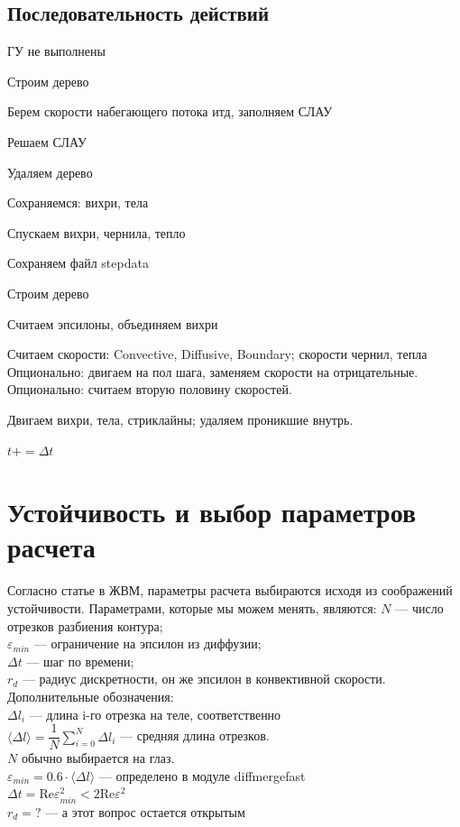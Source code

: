 \documentclass[14pt]{extreport}
\newcommand{\Reyn}{\text{Re}}
\newenvironment{packed_enum}{
\begin{enumerate}
  \setlength{\itemsep}{1pt}
  \setlength{\parskip}{0pt}
  \setlength{\parsep}{0pt}
}{\end{enumerate}}
\begin{document}
\subsection{Последовательность действий}
\begin{packed_enum}
\item ГУ не выполнены\\
\item Строим дерево
\item Берем скорости набегающего потока итд, заполняем СЛАУ
\item Решаем СЛАУ
\item Удаляем дерево\\
\item Сохраняемся: вихри, тела
\item Спускаем вихри, чернила, тепло
\item Сохраняем файл stepdata\\
\item Строим дерево
\item Считаем эпсилоны, объединяем вихри
\item Считаем скорости: Convective, Diffusive, Boundary; скорости чернил, тепла
\subitem Опционально: двигаем на пол шага, заменяем скорости на отрицательные.
\subitem Опционально: считаем вторую половину скоростей.
\item Двигаем вихри, тела, стриклайны; удаляем проникшие внутрь.
\item $t += \Delta t$
\end{packed_enum}

\newpage
\section{Устойчивость и выбор параметров расчета}
Согласно статье в ЖВМ, параметры расчета выбираются исходя из
соображений устойчивости. Параметрами, которые мы можем менять, являются:
$N$ --- число отрезков разбиения контура;\\
$\varepsilon_{min}$ --- ограничение на эпсилон из диффузии;\\
$\Delta t$ --- шаг по времени;\\
$r_d$ --- радиус дискретности, он же эпсилон в конвективной скорости.\\

Дополнительные обозначения:\\
$\Delta l_i$ --- длина i-го отрезка на теле, соответственно \\
$\langle\Delta l \rangle=\dfrac{1}{N} \sum\limits_{i=0}^{N} \Delta l_i$ ---
средняя длина отрезков.\\
$N$ обычно выбирается на глаз.\\
$\varepsilon_{min}=0.6\cdot\langle\Delta l \rangle$ --- 
определено в модуле diffmergefast\\
$\Delta t = \Reyn \varepsilon_{min}^2 < 2 \Reyn \varepsilon^2$\\
$r_d = ?$ --- а этот вопрос остается открытым \\
\end{document}
